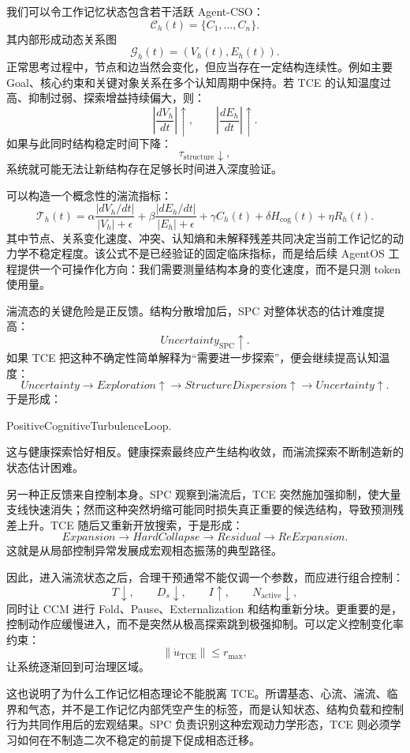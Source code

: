 我们可以令工作记忆状态包含若干活跃 Agent-CSO：
\[
\mathcal C_h(t)
=
\{C_1,\ldots,C_n\}.
\]
其内部形成动态关系图
\[
\mathcal G_h(t)
=
(V_h(t),E_h(t)).
\]
正常思考过程中，节点和边当然会变化，但应当存在一定结构连续性。例如主要 Goal、核心约束和关键对象关系在多个认知周期中保持。若 TCE 的认知温度过高、抑制过弱、探索增益持续偏大，则：
\[
\left|
\frac{dV_h}{dt}
\right|\uparrow,
\qquad
\left|
\frac{dE_h}{dt}
\right|\uparrow.
\]
如果与此同时结构稳定时间下降：
\[
\tau_{\mathrm{structure}}\downarrow,
\]
系统就可能无法让新结构存在足够长时间进入深度验证。

可以构造一个概念性的湍流指标：
\[
\mathcal T_h(t)
=
\alpha
\frac{|dV_h/dt|}{|V_h|+\epsilon}
+
\beta
\frac{|dE_h/dt|}{|E_h|+\epsilon}
+
\gamma C_h(t)
+
\delta H_{\mathrm{cog}}(t)
+
\eta R_h(t).
\]
其中节点、关系变化速度、冲突、认知熵和未解释残差共同决定当前工作记忆的动力学不稳定程度。该公式不是已经验证的固定临床指标，而是给后续 AgentOS 工程提供一个可操作化方向：我们需要测量结构本身的变化速度，而不是只测 token 使用量。

湍流态的关键危险是正反馈。结构分散增加后，SPC 对整体状态的估计难度提高：
\[
Uncertainty_{\mathrm{SPC}}\uparrow.
\]
如果 TCE 把这种不确定性简单解释为“需要进一步探索”，便会继续提高认知温度：
\[
Uncertainty
\rightarrow
Exploration\uparrow
\rightarrow
StructureDispersion\uparrow
\rightarrow
Uncertainty\uparrow.
\]
于是形成：
\begin{statementbox}
PositiveCognitiveTurbulenceLoop.
\end{statementbox}
这与健康探索恰好相反。健康探索最终应产生结构收敛，而湍流探索不断制造新的状态估计困难。

另一种正反馈来自控制本身。SPC 观察到湍流后，TCE 突然施加强抑制，使大量支线快速消失；然而这种突然坍缩可能同时损失真正重要的候选结构，导致预测残差上升。TCE 随后又重新开放搜索，于是形成：
\[
Expansion
\rightarrow
HardCollapse
\rightarrow
Residual
\rightarrow
ReExpansion.
\]
这就是从局部控制异常发展成宏观相态振荡的典型路径。

因此，进入湍流状态之后，合理干预通常不能仅调一个参数，而应进行组合控制：
\[
T\downarrow,\qquad
D_s\downarrow,\qquad
I\uparrow,\qquad
N_{\mathrm{active}}\downarrow,
\]
同时让 CCM 进行 Fold、Pause、Externalization 和结构重新分块。更重要的是，控制动作应缓慢进入，而不是突然从极高探索跳到极强抑制。可以定义控制变化率约束：
\[
\left\|
\dot u_{\mathrm{TCE}}
\right\|
\leq
r_{\max},
\]
让系统逐渐回到可治理区域。

这也说明了为什么工作记忆相态理论不能脱离 TCE。所谓基态、心流、湍流、临界和气态，并不是工作记忆内部凭空产生的标签，而是认知状态、结构负载和控制行为共同作用后的宏观结果。SPC 负责识别这种宏观动力学形态，TCE 则必须学习如何在不制造二次不稳定的前提下促成相态迁移。

